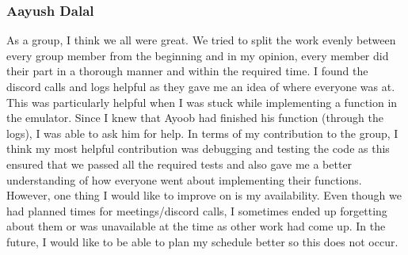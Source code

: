 \documentclass[11pt]{article}
\begin{document}
\subsubsection{Aayush Dalal}
As a group, I think we all were great. We tried to split the work evenly between every group member from the beginning and in my opinion, every member did their part in a thorough manner and within the required time. I found the discord calls and logs helpful as they gave me an idea of where everyone was at. This was particularly helpful when I was stuck while implementing a function in the emulator. Since I knew that Ayoob had finished his function (through the logs), I was able to ask him for help. In terms of my contribution to the group, I think my most helpful contribution was debugging and testing the code as this ensured that we passed all the required tests and also gave me a better understanding of how everyone went about implementing their functions. However, one thing I would like to improve on is my availability. Even though we had planned times for meetings/discord calls, I sometimes ended up forgetting about them or was unavailable at the time as other work had come up. In the future, I would like to be able to plan my schedule better so this does not occur.
\end{document}
